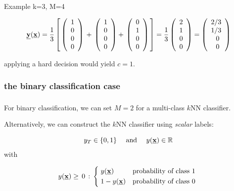 \begin{frame}
Example k=3, M=4

\begin{equation}
\underline{\mathbf{y}}(\underline{\mathbf{x}}) = \frac{1}{3}
\left\lbrack
\,
\left( \begin{array}{rrrrrrrrrrrrrrrrrrrrrrrrrr}  1 \\ 0 \\ 0 \\ 0\\ \end{array} \right)\, +\,
\left( \begin{array}{rrrrrrrrrrrrrrrrrrrrrrrrrr}  1 \\ 0 \\ 0 \\ 0\\ \end{array} \right) +\,
\left( \begin{array}{rrrrrrrrrrrrrrrrrrrrrrrrrr}  0 \\ 1 \\ 0 \\ 0\\ \end{array} \right)\,
\right\rbrack
=
\frac{1}{3}
\left( \begin{array}{rrrrrrrrrrrrrrrrrrrrrrrrrr}  2 \\ 1 \\ 0 \\ 0\\ \end{array} \right)
=
\left( \begin{array}{rrrrrrrrrrrrrrrrrrrrrrrrrr}  2/3 \\ 1/3 \\ 0\; \\ 0\;\\ \end{array} \right)
\end{equation}

applying a hard decision would yield $c=1$.
    
\end{frame}

\subsubsection{the binary classification case}

\begin{frame}\frametitle{\subsubsecname}

For binary classification, we can set $M=2$ for a multi-class $k$NN classifier.

Alternatively, we can construct the $k$NN classifier  using \emph{scalar} labels:

\begin{equation}
y_T \in \{0,1\}\quad \text{ and }\quad y(\underline{\mathbf{x}}) \in \mathbb{R}
\end{equation}
with

\begin{equation}
y(\vec x) \ge\,0\,:\,
\begin{cases*}
      \;y(\vec x) & probability of class $1$ \\
      \;1-y(\vec x)     & probability of class $0$
    \end{cases*}
\end{equation}

\end{frame}

